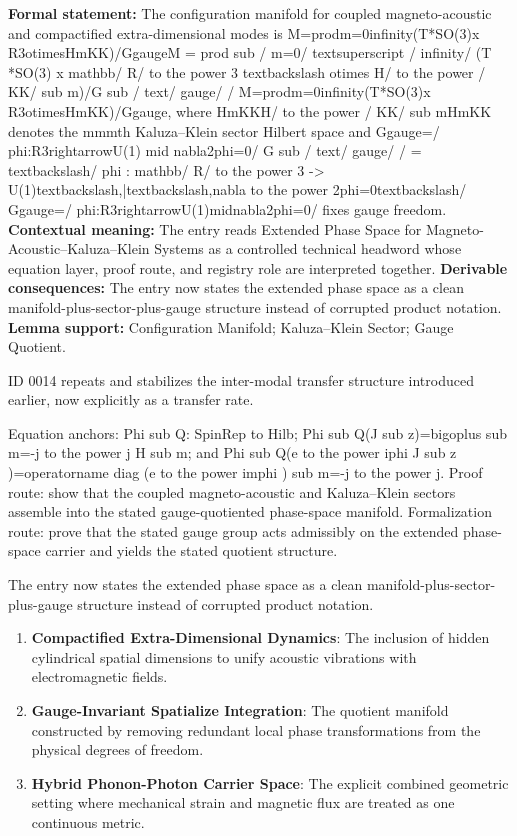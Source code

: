 \begingroup\footnotesize\setlength{\emergencystretch}{3em}\sloppy
\textbf{Formal statement:} The configuration manifold for coupled magneto-acoustic and compactified extra-dimensional modes is M=prodm=0infinity(T*SO(3)x R3otimesHmKK)/GgaugeM = prod sub / m=0/ textsuperscript / infinity/ (T *SO(3) x mathbb/ R/ to the power 3 textbackslash otimes H/ to the power / KK/ sub m)/G sub / text/ gauge/ / M=prodm=0infinity(T*SO(3)x R3otimesHmKK)/Ggauge, where HmKKH/ to the power / KK/ sub mHmKK denotes the mmmth Kaluza--Klein sector Hilbert space and Ggauge=/ phi:R3rightarrowU(1) mid nabla2phi=0/ G sub / text/ gauge/ / = textbackslash/ phi : mathbb/ R/ to the power 3 -> U(1)textbackslash,|textbackslash,nabla to the power 2phi=0textbackslash/ Ggauge=/ phi:R3rightarrowU(1)midnabla2phi=0/ fixes gauge freedom. \textbf{Contextual meaning:} The entry reads Extended Phase Space for Magneto-Acoustic--Kaluza--Klein Systems as a controlled technical headword whose equation layer, proof route, and registry role are interpreted together. \textbf{Derivable consequences:} The entry now states the extended phase space as a clean manifold-plus-sector-plus-gauge structure instead of corrupted product notation. \textbf{Lemma support:} Configuration Manifold; Kaluza--Klein Sector; Gauge Quotient.\par
\endgroup

ID 0014 repeats and stabilizes the inter-modal transfer structure introduced earlier, now explicitly as a transfer rate.

Equation anchors: Phi sub Q: SpinRep to Hilb; Phi sub Q(J sub z)=bigoplus sub m=-j to the power j H sub m; and Phi sub Q(e to the power iphi J sub z )=operatorname diag (e to the power imphi ) sub m=-j to the power j. Proof route: show that the coupled magneto-acoustic and Kaluza--Klein sectors assemble into the stated gauge-quotiented phase-space manifold. Formalization route: prove that the stated gauge group acts admissibly on the extended phase-space carrier and yields the stated quotient structure.

The entry now states the extended phase space as a clean manifold-plus-sector-plus-gauge structure instead of corrupted product notation.
\endgroup

\begin{enumerate}[leftmargin=1.6em,itemsep=6pt,topsep=4pt]
\item \textbf{Compactified Extra-Dimensional Dynamics}: The inclusion of hidden cylindrical spatial dimensions to unify acoustic vibrations with electromagnetic fields.
\item \textbf{Gauge-Invariant Spatialize Integration}: The quotient manifold constructed by removing redundant local phase transformations from the physical degrees of freedom.
\item \textbf{Hybrid Phonon-Photon Carrier Space}: The explicit combined geometric setting where mechanical strain and magnetic flux are treated as one continuous metric.
\end{enumerate}

